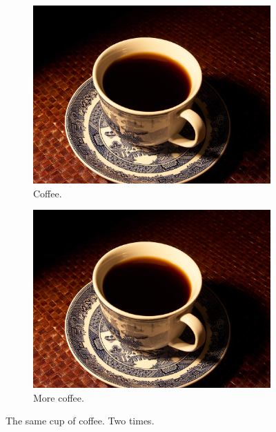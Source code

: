 \documentclass[a4paper,11pt]{article}
\begin{document}
\begin{figure}[h!]
	\centering
	\begin{subfigure}[b]{0.4\linewidth}
		\includegraphics[width=\linewidth]{coffee.jpg}
		\caption{Coffee.}
	\end{subfigure}
	\begin{subfigure}[b]{0.4\linewidth}
		\includegraphics[width=\linewidth]{coffee.jpg}
		\caption{More coffee.}
	\end{subfigure}
	\caption{The same cup of coffee. Two times.}
	\label{fig:coffee}
\end{figure}

\pagebreak
\end{document}
